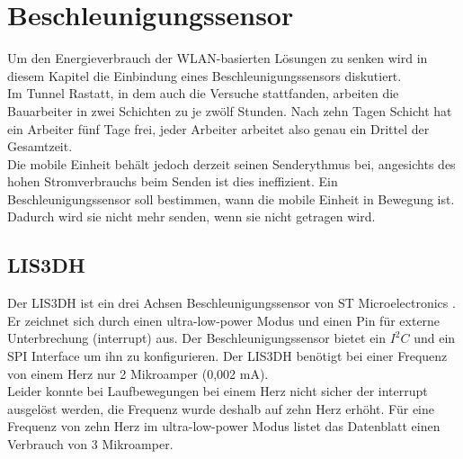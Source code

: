 \chapter{Beschleunigungssensor}
\label{ch:Beschleunigungssensor}
Um den Energieverbrauch der WLAN-basierten Lösungen zu senken wird in diesem Kapitel die Einbindung eines Beschleunigungssensors diskutiert. \\
Im Tunnel Rastatt, in dem auch die Versuche stattfanden, arbeiten die Bauarbeiter in zwei Schichten zu je zwölf Stunden. 
Nach zehn Tagen Schicht hat ein Arbeiter fünf Tage frei, jeder Arbeiter arbeitet also genau ein Drittel der Gesamtzeit. \\
Die mobile Einheit behält jedoch derzeit seinen Senderythmus bei, angesichts des hohen Stromverbrauchs beim Senden ist dies ineffizient.
Ein Beschleunigungssensor soll bestimmen, wann die mobile Einheit in Bewegung ist. 
Dadurch wird sie nicht mehr senden, wenn sie nicht getragen wird.

\section{LIS3DH}
Der LIS3DH ist ein drei Achsen Beschleunigungssensor von ST Microelectronics \cite{st2015lis}.
Er zeichnet sich durch einen ultra-low-power Modus und einen Pin für externe Unterbrechung (interrupt) aus.
Der Beschleunigungssensor bietet ein $I^2C$ und ein SPI Interface um ihn zu konfigurieren.
Der LIS3DH benötigt bei einer Frequenz von einem Herz nur 2 Mikroamper (0,002 mA).\\
Leider konnte bei Laufbewegungen bei einem Herz nicht sicher der interrupt ausgelöst werden, die Frequenz wurde deshalb auf zehn Herz erhöht.
Für eine Frequenz von zehn Herz im ultra-low-power Modus listet das Datenblatt einen Verbrauch von 3 Mikroamper.

